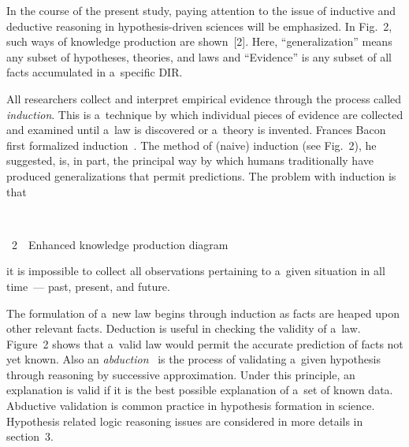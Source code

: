 \begin{multicols}{2}
  In the course of the present study, paying attention to the issue of
  inductive and deductive
reasoning in hypothesis-driven sciences will be emphasized.  In Fig.~2,
such ways of
knowledge production are shown~[2]. Here, ``generalization'' means any subset of
hypotheses, theories, and laws and ``Evidence'' is any subset of all facts accumulated
in a~specific DIR.

  All researchers collect and interpret empirical evidence through the process called
\textit{induction}. This is a~technique by which individual pieces of evidence are
collected and examined until a~law is discovered or a~theory is invented. Frances
Bacon first formalized induction~\cite{5-kl}. The method of
(naive) induction (see Fig.~2), he suggested, is, in part, the
principal way by which humans traditionally have produced generalizations that
permit predictions. The problem with induction is that\linebreak

\begin{center}  %
\vspace*{-3pt}
\mbox{%
 \epsfxsize=65.106mm
 }

\vspace*{6pt}

\noindent
{{\figurename~2}\ \ \small{Enhanced knowledge production diagram}}

\end{center}





\addtocounter{figure}{2}


\noindent
 it is impossible to collect
all observations pertaining to a~given situation in all time~--- past, present, and future.

  The formulation of a~new law begins through induction as facts are heaped upon
other relevant facts. Deduction is useful in checking the validity of a~law. Figure~2
shows that a~valid law would permit the accurate prediction  of  facts  not  yet
known.  Also an \textit{abduction}~\cite{6-kl} is the process of validating a~given
hypothesis through reasoning by successive approximation. Under this principle, an
explanation is valid if it is the best possible explanation of a~set of known data.
Abductive validation is common practice in hypothesis formation in science.
Hypothesis related logic reasoning issues are considered in more details in section~3.


\end{multicols}
